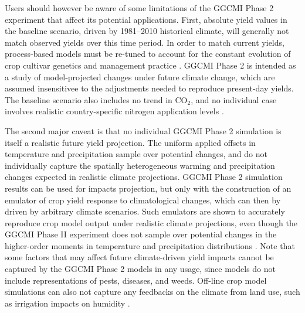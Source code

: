 \documentclass[gmd, manuscript]{copernicus} %
\begin{document}
Users should however be aware of some limitations of the GGCMI Phase 2 experiment that affect its potential applications. 
First, absolute yield values in the baseline scenario, driven by 1981--2010 historical climate, will generally not match observed yields over this time period. 
In order to match current yields, process-based models must be re-tuned to account for the constant evolution of crop cultivar genetics and management practice \citep[e.g.][]{JONES2017b}. 
GGCMI Phase 2 is intended as a study of model-projected changes under future climate change, which are assumed insensitivee to the adjustments needed to reproduce present-day yields. 
The baseline scenario also includes no trend in CO$_2$, and no individual case involves realistic country-specific nitrogen application levels \citep{Elliott2015}.


The second major caveat is that no individual GGCMI Phase 2 simulation is itself a realistic future yield projection. 
The uniform applied offsets in temperature and precipitation sample over potential changes, and do not individually capture the spatially heterogeneous warming and precipitation changes expected in realistic climate projections. 
GGCMI Phase 2 simulation results can be used for impacts projection, but only with the construction of an emulator of crop yield response to climatological changes, which can then by driven by arbitrary climate scenarios.
Such emulators are shown to accurately reproduce crop model output under realistic climate projections, even though the GGCMI Phase II experiment
does not sample over potential changes in the higher-order moments in temperature and precipitation distributions \citep{Franke2020}.
Note that some factors that may affect future climate-driven yield impacts cannot be captured by the GGCMI Phase 2 models in any usage, since models do not include representations of pests, diseases, and weeds. Off-line crop model simulations can also not capture any feedbacks on the climate from land use, such as irrigation impacts on humidity \citep[e.g.][]{Decker2017}.

\end{document}
